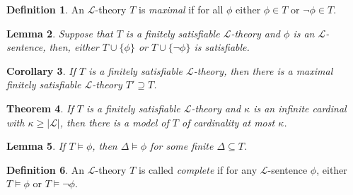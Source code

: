 \documentclass{amsart}
\newtheorem{theorem}{Theorem}[subsection]
\newtheorem{lemma}[theorem]{Lemma}
\newtheorem{corollary}[theorem]{Corollary}
\theoremstyle{definition}
\newtheorem{definition}[theorem]{Definition}
\numberwithin{equation}{section}
\begin{document}
\begin{definition}
  An $\mathcal{L}$-theory $T$ is \emph{maximal} if for all $\phi$ either $\phi \in T$ or $\neg \phi \in T$. 
\end{definition}



\begin{lemma}
  Suppose that $T$ is a finitely satisfiable $\mathcal{L}$-theory and $\phi$ is an $\mathcal{L}$-sentence, then,
  either $T \cup \{\phi\}$ or $T \cup \{\neg\phi\}$ is satisfiable.
\end{lemma}

\begin{corollary}
  If $T$ is a finitely satisfiable $\mathcal{L}$-theory,
  then there is a maximal finitely satisfiable $\mathcal{L}$-theory $T' \supseteq T$.
\end{corollary}

\begin{theorem}
  If $T$ is a finitely satisfiable $\mathcal{L}$-theory and $\kappa$ is an infinite cardinal with $\kappa \ge |\mathcal{L}|$,
  then there is a model of $T$ of cardinality at most $\kappa$. 
\end{theorem}

\begin{lemma}
  If $T \models \phi$, then $\Delta \models \phi$ for some finite $\Delta \subseteq T$.
\end{lemma}

\begin{definition}
  An $\mathcal{L}$-theory $T$ is called \emph{complete} if for any $\mathcal{L}$-sentence $\phi$,
  either $T \models \phi$ or $T \models \neg\phi$.
\end{definition}
\end{document}
